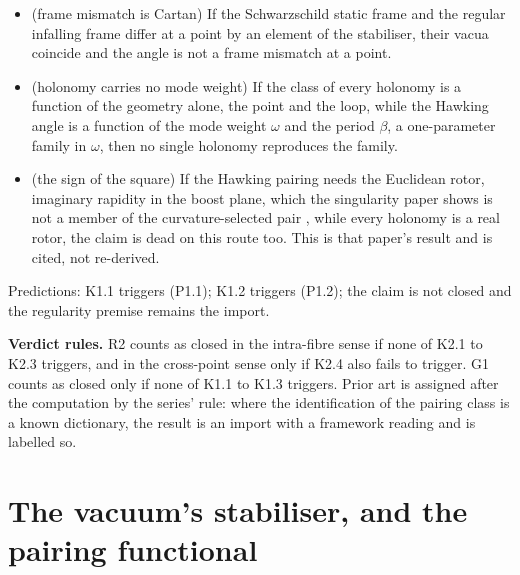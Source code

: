 \documentclass[11pt]{article}
\theoremstyle{definition}
\theoremstyle{plain}
\begin{document}
\begin{itemize}
\item[K1.1] (frame mismatch is Cartan) If the Schwarzschild static frame and the regular infalling frame differ at a point by an element of the stabiliser, their vacua coincide and the angle is not a frame mismatch at a point.
\item[K1.2] (holonomy carries no mode weight) If the class of every holonomy is a function of the geometry alone, the point and the loop, while the Hawking angle is a function of the mode weight $\omega$ and the period $\beta$, a one-parameter family in $\omega$, then no single holonomy reproduces the family.
\item[K1.3] (the sign of the square) If the Hawking pairing needs the Euclidean rotor, imaginary rapidity in the boost plane, which the singularity paper shows is not a member of the curvature-selected pair \cite[Prop.~7.21(3)]{ButlerT5}, while every holonomy is a real rotor, the claim is dead on this route too. This is that paper's result and is cited, not re-derived.
\end{itemize}
Predictions: K1.1 triggers (P1.1); K1.2 triggers (P1.2); the claim is not closed and the regularity premise remains the import.

\label{c:note.pairing.setting-two-claims-kill-conditions-fixed-4}
\textbf{Verdict rules.} R2 counts as closed in the intra-fibre sense if none of K2.1 to K2.3 triggers, and in the cross-point sense only if K2.4 also fails to trigger. G1 counts as closed only if none of K1.1 to K1.3 triggers. Prior art is assigned after the computation by the series' rule: where the identification of the pairing class is a known dictionary, the result is an import with a framework reading and is labelled so.

\section{The vacuum's stabiliser, and the pairing functional}
\end{document}
